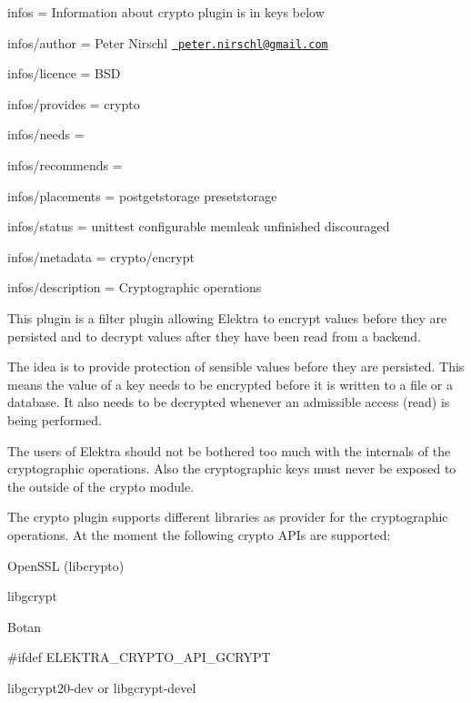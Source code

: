 
\begin{DoxyItemize}
\item infos = Information about crypto plugin is in keys below
\item infos/author = Peter Nirschl \href{mailto:peter.nirschl@gmail.com}{\texttt{ peter.\+nirschl@gmail.\+com}}
\item infos/licence = B\+SD
\item infos/provides = crypto
\item infos/needs =
\item infos/recommends =
\item infos/placements = postgetstorage presetstorage
\item infos/status = unittest configurable memleak unfinished discouraged
\item infos/metadata = crypto/encrypt
\item infos/description = Cryptographic operations
\end{DoxyItemize}

This plugin is a filter plugin allowing Elektra to encrypt values before they are persisted and to decrypt values after they have been read from a backend.

The idea is to provide protection of sensible values before they are persisted. This means the value of a key needs to be encrypted before it is written to a file or a database. It also needs to be decrypted whenever an admissible access (read) is being performed.

The users of Elektra should not be bothered too much with the internals of the cryptographic operations. Also the cryptographic keys must never be exposed to the outside of the crypto module.

The crypto plugin supports different libraries as provider for the cryptographic operations. At the moment the following crypto A\+P\+Is are supported\+:


\begin{DoxyItemize}
\item Open\+S\+SL ({\ttfamily libcrypto})
\item libgcrypt
\item Botan
\end{DoxyItemize}

\#ifdef E\+L\+E\+K\+T\+R\+A\+\_\+\+C\+R\+Y\+P\+T\+O\+\_\+\+A\+P\+I\+\_\+\+G\+C\+R\+Y\+PT


\begin{DoxyItemize}
\item {\ttfamily libgcrypt20-\/dev} or {\ttfamily libgcrypt-\/devel}
\end{DoxyItemize}


